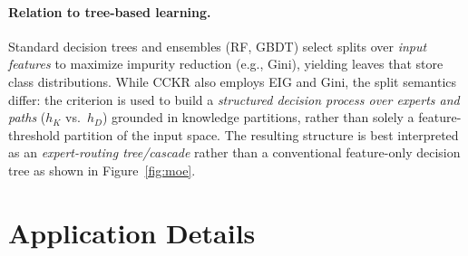 \documentclass{article}
\begin{document}
\paragraph{Relation to tree-based learning.}
Standard decision trees and ensembles (RF, GBDT) select splits over
\emph{input features} to maximize impurity reduction (e.g., Gini),
yielding leaves that store class distributions. While CCKR also employs
EIG and Gini, the split semantics differ: the criterion is used to build a
\emph{structured decision process over experts and paths} ($h_K$ vs.\
$h_D$) grounded in knowledge partitions, rather than solely a
feature-threshold partition of the input space. The resulting structure is
best interpreted as an \emph{expert-routing tree/cascade} rather than a
conventional feature-only decision tree as shown in Figure~\ref{fig:moe}.
\section{Application Details}
\label{app:applications}
\end{document}
